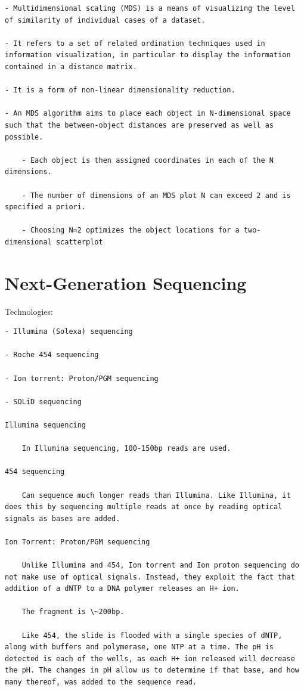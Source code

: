 \documentclass[
]{book}
\begin{document}
\begin{verbatim}
- Multidimensional scaling (MDS) is a means of visualizing the level of similarity of individual cases of a dataset.

- It refers to a set of related ordination techniques used in information visualization, in particular to display the information contained in a distance matrix.

- It is a form of non-linear dimensionality reduction.

- An MDS algorithm aims to place each object in N-dimensional space such that the between-object distances are preserved as well as possible.

    - Each object is then assigned coordinates in each of the N dimensions.

    - The number of dimensions of an MDS plot N can exceed 2 and is specified a priori.

    - Choosing N=2 optimizes the object locations for a two-dimensional scatterplot
\end{verbatim}

\hypertarget{next-generation-sequencing}{%
\section{Next-Generation Sequencing}\label{next-generation-sequencing}}

Technologies:

\begin{verbatim}
- Illumina (Solexa) sequencing

- Roche 454 sequencing

- Ion torrent: Proton/PGM sequencing

- SOLiD sequencing

Illumina sequencing

    In Illumina sequencing, 100-150bp reads are used.

454 sequencing

    Can sequence much longer reads than Illumina. Like Illumina, it does this by sequencing multiple reads at once by reading optical signals as bases are added.

Ion Torrent: Proton/PGM sequencing

    Unlike Illumina and 454, Ion torrent and Ion proton sequencing do not make use of optical signals. Instead, they exploit the fact that addition of a dNTP to a DNA polymer releases an H+ ion.

    The fragment is \~200bp.

    Like 454, the slide is flooded with a single species of dNTP, along with buffers and polymerase, one NTP at a time. The pH is detected is each of the wells, as each H+ ion released will decrease the pH. The changes in pH allow us to determine if that base, and how many thereof, was added to the sequence read.
\end{verbatim}
\end{document}
